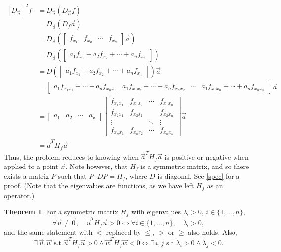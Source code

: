\documentclass{article}
\theoremstyle{definition}
\newtheorem{thm}{Theorem}[subsubsection]
\begin{document}
\begin{align*}
	\left[D_{\vec a}\right]^2f&=D_{\vec a}(D_{\vec a}f)\\
	&=D_{\vec a}(D_f\vec a)\\
	&=D_{\vec a}(\begin{bmatrix}f_{x_1}&f_{x_2}&\cdots&f_{x_n}\end{bmatrix}\vec a)\\
	&=D_{\vec a}(\begin{bmatrix}a_1f_{x_1}+a_2f_{x_2}+\cdots+a_nf_{x_n}\end{bmatrix})\\
	&=D(\begin{bmatrix}a_1f_{x_1}+a_2f_{x_2}+\cdots+a_nf_{x_n}\end{bmatrix})\vec a\\
	&=\begin{bmatrix}a_1f_{x_1x_1}+\cdots+a_nf_{x_nx_1}&a_1f_{x_1x_2}+\cdots+a_nf_{x_nx_2}&\cdots&a_1f_{x_1x_n}+\cdots+a_nf_{x_nx_n}\end{bmatrix}\vec a\\
	&=\begin{bmatrix}a_1&a_2&\cdots&a_n\end{bmatrix}\begin{bmatrix}f_{x_1x_1}&f_{x_1x_2}&\cdots&f_{x_1x_n}\\f_{x_2x_1}&f_{x_2x_2}&&f_{x_2x_n}\\\vdots&&\ddots&\vdots\\f_{x_nx_1}&f_{x_nx_2}&\cdots&f_{x_nx_n}\end{bmatrix}\vec a\\
	&=\vec a^T H_f\vec a
\end{align*}
Thus, the problem reduces to knowing when $\vec a^T H_f\vec a$ is positive or negative when applied to a point $\vec x$. Note however, that $H_f$ is a symmetric matrix, and so there exists a matrix $P$ such that $P^-DP=H_f$, where $D$ is diagonal. See \ref{spec} for a proof. (Note that the eigenvalues are functions, as we have left $H_f$ as an operator.)
\begin{thm}
	For a symmetric matrix $H_f$ with eigenvalues $\lambda_i>0,\,i\in\{1,...,n\}$,
	\[\forall\vec{u}\not=\vec{0},\quad\vec{u}^TH_f\vec{u}>0\iff\forall i\in\{1,...,n\},\quad\lambda_i>0,\]
	and the same statement with $<$ replaced by $\leq$, $>$ or $\geq$ also holds.
	Also, \[\exists\,\vec{u},\vec{w}\text{ s.t }\vec{u}^TH_f\vec{u}>0\land\vec{w}^TH_f\vec{w}<0\iff\exists\,i,j\text{ s.t }\lambda_i>0\land\lambda_j<0.\]
\end{thm}
\end{document}
